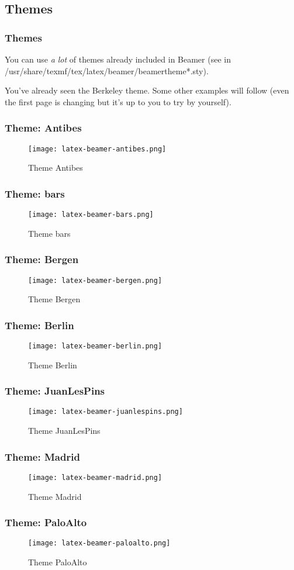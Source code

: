 \documentclass{beamer}
\begin{document}
\subsection{Themes}

\frame
{
	\frametitle{Themes}

	You can use \textit{a lot} of themes already included in Beamer (see in /usr/share/texmf/tex/latex/beamer/beamertheme*.sty).

	You've already seen the Berkeley theme. Some other examples will follow (even the first page is changing but it's up to you to try by yourself).
}

\frame
{
	\frametitle{Theme: Antibes}
	\begin{figure}
	\centering
	\texttt{[image: latex-beamer-antibes.png]}
	\caption{Theme Antibes}
	\end{figure}
}

\frame
{
	\frametitle{Theme: bars}
	\begin{figure}
	\centering
	\texttt{[image: latex-beamer-bars.png]}
	\caption{Theme bars}
	\end{figure}
}

\frame
{
	\frametitle{Theme: Bergen}
	\begin{figure}
	\centering
	\texttt{[image: latex-beamer-bergen.png]}
	\caption{Theme Bergen}
	\end{figure}
}

\frame
{
	\frametitle{Theme: Berlin}
	\begin{figure}
	\centering
	\texttt{[image: latex-beamer-berlin.png]}
	\caption{Theme Berlin}
	\end{figure}
}

\frame
{
	\frametitle{Theme: JuanLesPins}
	\begin{figure}
	\centering
	\texttt{[image: latex-beamer-juanlespins.png]}
	\caption{Theme JuanLesPins}
	\end{figure}
}

\frame
{
	\frametitle{Theme: Madrid}
	\begin{figure}
	\centering
	\texttt{[image: latex-beamer-madrid.png]}
	\caption{Theme Madrid}
	\end{figure}
}

\frame
{
	\frametitle{Theme: PaloAlto}
	\begin{figure}
	\centering
	\texttt{[image: latex-beamer-paloalto.png]}
	\caption{Theme PaloAlto}
	\end{figure}
}
\end{document}
